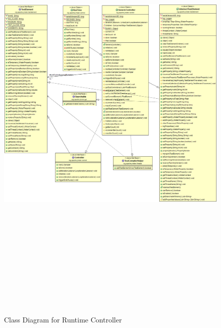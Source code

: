 \documentclass[12pt]{book}
\begin{document}
  \begin{figure}[H]
   \centering
   \includegraphics[width=17cm, height=22cm]{images/controller_runtime}
   \caption{Class Diagram for Runtime Controller\label{fig:fig7_JMeter}}
  \end{figure}
  
\end{document}
